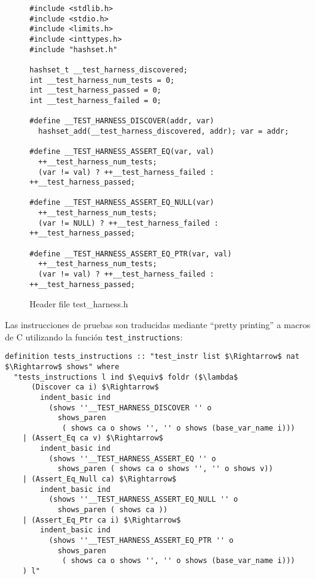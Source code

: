 \begin{figure}
\begin{lstlisting}[mathescape=true]
#include <stdlib.h>
#include <stdio.h>
#include <limits.h>
#include <inttypes.h>
#include "hashset.h"

hashset_t __test_harness_discovered;
int __test_harness_num_tests = 0;
int __test_harness_passed = 0;
int __test_harness_failed = 0;

#define __TEST_HARNESS_DISCOVER(addr, var)
  hashset_add(__test_harness_discovered, addr); var = addr;

#define __TEST_HARNESS_ASSERT_EQ(var, val)
  ++__test_harness_num_tests;
  (var != val) ? ++__test_harness_failed : ++__test_harness_passed;

#define __TEST_HARNESS_ASSERT_EQ_NULL(var)
  ++__test_harness_num_tests;
  (var != NULL) ? ++__test_harness_failed : ++__test_harness_passed;

#define __TEST_HARNESS_ASSERT_EQ_PTR(var, val)
  ++__test_harness_num_tests;
  (var != val) ? ++__test_harness_failed : ++__test_harness_passed;
\end{lstlisting}

\caption{Header file test\_harness.h}
\label{fig:header_test_harness}
\end{figure}


Las instrucciones de pruebas son traducidas mediante ``pretty printing'' a macros de C utilizando la función \verb|test_instructions|:

\begin{lstlisting}[mathescape=true, frame=single]
definition tests_instructions :: "test_instr list $\Rightarrow$ nat $\Rightarrow$ shows" where
  "tests_instructions l ind $\equiv$ foldr ($\lambda$
      (Discover ca i) $\Rightarrow$
        indent_basic ind
          (shows ''__TEST_HARNESS_DISCOVER '' o
            shows_paren
             ( shows ca o shows '', '' o shows (base_var_name i)))
    | (Assert_Eq ca v) $\Rightarrow$
        indent_basic ind
          (shows ''__TEST_HARNESS_ASSERT_EQ '' o
            shows_paren ( shows ca o shows '', '' o shows v))
    | (Assert_Eq_Null ca) $\Rightarrow$
        indent_basic ind
          (shows ''__TEST_HARNESS_ASSERT_EQ_NULL '' o
            shows_paren ( shows ca ))
    | (Assert_Eq_Ptr ca i) $\Rightarrow$
        indent_basic ind
          (shows ''__TEST_HARNESS_ASSERT_EQ_PTR '' o
            shows_paren
             ( shows ca o shows '', '' o shows (base_var_name i)))
    ) l"
\end{lstlisting}


